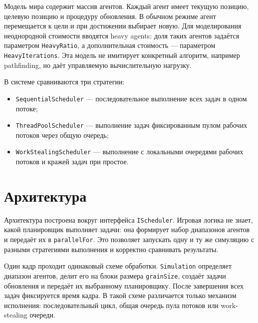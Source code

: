 \documentclass[14pt,a4paper,oneside]{extreport}
\begin{document}
Модель мира содержит массив агентов. Каждый агент имеет текущую позицию, целевую позицию и процедуру обновления. В обычном режиме агент перемещается к цели и при достижении выбирает новую. Для моделирования неоднородной стоимости вводятся heavy agents: доля таких агентов задаётся параметром \texttt{HeavyRatio}, а дополнительная стоимость --- параметром \texttt{HeavyIterations}. Эта модель не имитирует конкретный алгоритм, например pathfinding, но даёт управляемую вычислительную нагрузку.

В системе сравниваются три стратегии:
\begin{itemize}
    \item \texttt{SequentialScheduler} --- последовательное выполнение всех задач в одном потоке;
    \item \texttt{ThreadPoolScheduler} --- выполнение задач фиксированным пулом рабочих потоков через общую очередь;
    \item \texttt{WorkStealingScheduler} --- выполнение с локальными очередями рабочих потоков и кражей задач при простое.
\end{itemize}

\section{Архитектура}

Архитектура построена вокруг интерфейса \texttt{IScheduler}. Игровая логика не знает, какой планировщик выполняет задачи: она формирует набор диапазонов агентов и передаёт их в \texttt{parallelFor}. Это позволяет запускать одну и ту же симуляцию с разными стратегиями выполнения и корректно сравнивать результаты.

Один кадр проходит одинаковый схеме обработки. \texttt{Simulation} определяет диапазон агентов, делит его на блоки размера \texttt{grainSize}, создаёт задачи обновления и передаёт их выбранному планировщику. После завершения всех задач фиксируется время кадра. В такой схеме различается только механизм исполнения: последовательный цикл, общая очередь пула потоков или work-stealing очереди.
\end{document}
